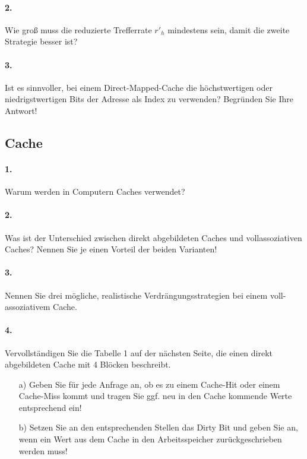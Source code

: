 \documentclass[paper=a4, fontsize=11pt]{scrartcl}
\numberwithin{equation}{section}
\numberwithin{figure}{section}
\numberwithin{table}{section}
\begin{document}
\paragraph{2.}
Wie groß muss die reduzierte Trefferrate $r'_{h}$ mindestens sein, damit die zweite Strategie besser ist?

\paragraph{3.}
Ist es sinnvoller, bei einem Direct-Mapped-Cache die höchstwertigen oder niedrigstwertigen Bits der Adresse als Index zu verwenden? Begründen Sie Ihre Antwort!

\subsection{Cache}

\paragraph{1.}
Warum werden in Computern Caches verwendet?

\paragraph{2.}
Was ist der Unterschied zwischen direkt abgebildeten Caches und vollassoziativen Caches? Nennen Sie je einen Vorteil der beiden Varianten!

\paragraph{3.}
Nennen Sie drei mögliche, realistische Verdrängungsstrategien bei einem voll-assoziativem Cache.

\paragraph{4.}
Vervollständigen Sie die Tabelle 1 auf der nächsten Seite, die einen direkt abgebildeten Cache mit 4 Blöcken beschreibt.

\begin{itemize}
\item[a)] Geben Sie für jede Anfrage an, ob es zu einem Cache-Hit oder einem Cache-Miss kommt und tragen Sie ggf. neu in den Cache kommende Werte entsprechend ein!
\item[b)] Setzen Sie an den entsprechenden Stellen das Dirty Bit und geben Sie an, wenn ein Wert aus dem Cache in den Arbeitsspeicher zurückgeschrieben werden muss!
\end{itemize}
\end{document}
